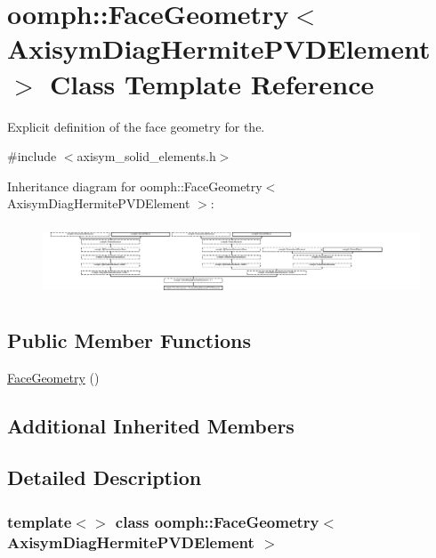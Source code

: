 \hypertarget{classoomph_1_1FaceGeometry_3_01AxisymDiagHermitePVDElement_01_4}{}\section{oomph\+:\+:Face\+Geometry$<$ Axisym\+Diag\+Hermite\+P\+V\+D\+Element $>$ Class Template Reference}
\label{classoomph_1_1FaceGeometry_3_01AxisymDiagHermitePVDElement_01_4}


Explicit definition of the face geometry for the.  




{\ttfamily \#include $<$axisym\+\_\+solid\+\_\+elements.\+h$>$}

Inheritance diagram for oomph\+:\+:Face\+Geometry$<$ Axisym\+Diag\+Hermite\+P\+V\+D\+Element $>$\+:\begin{figure}[H]
\begin{center}
\leavevmode
\includegraphics[height=2.139446cm]{classoomph_1_1FaceGeometry_3_01AxisymDiagHermitePVDElement_01_4}
\end{center}
\end{figure}
\subsection*{Public Member Functions}
\begin{DoxyCompactItemize}
\item 
\hyperlink{classoomph_1_1FaceGeometry_3_01AxisymDiagHermitePVDElement_01_4_aa0a1300dacd623e039294b2bdefaceef}{Face\+Geometry} ()
\end{DoxyCompactItemize}
\subsection*{Additional Inherited Members}


\subsection{Detailed Description}
\subsubsection*{template$<$$>$\newline
class oomph\+::\+Face\+Geometry$<$ Axisym\+Diag\+Hermite\+P\+V\+D\+Element $>$}


